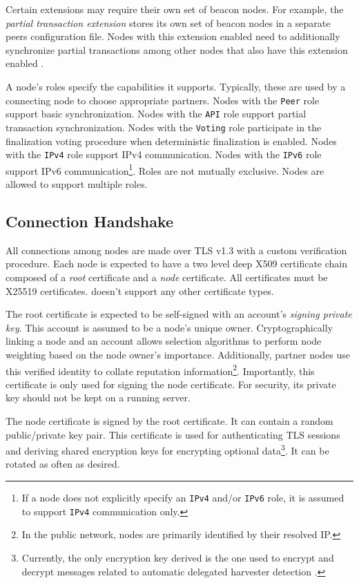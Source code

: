Certain extensions may require their own set of beacon nodes.
For example, the \emph{partial transaction extension} stores its own set of beacon nodes in a separate peers configuration file.
Nodes with this extension enabled need to additionally synchronize partial transactions among other nodes that also have this extension enabled  .

A node's roles specify the capabilities it supports.
Typically, these are used by a connecting node to choose appropriate partners.
Nodes with the \texttt{Peer} role support basic synchronization.
Nodes with the \texttt{API} role support partial transaction synchronization.
Nodes with the \texttt{Voting} role participate in the finalization voting procedure when deterministic finalization is enabled.
Nodes with the \texttt{IPv4} role support IPv4 communication.
Nodes with the \texttt{IPv6} role support IPv6 communication\footnote{
	If a node does not explicitly specify an \texttt{IPv4} and/or \texttt{IPv6} role, it is assumed to support \texttt{IPv4} communication only.
}.
Roles are not mutually exclusive.
Nodes are allowed to support multiple roles.

\subsection{Connection Handshake}
\label{sec:network:connectionHandshake}

All connections among \codenamespace nodes are made over TLS v1.3 with a custom verification procedure.
Each node is expected to have a two level deep X509 certificate chain composed of a \emph{root} certificate and a \emph{node} certificate.
All certificates must be X25519 certificates.
\codenamespace doesn't support any other certificate types.

The root certificate is expected to be self-signed with an account's \emph{signing private key}.
This account is assumed to be a node's unique owner.
Cryptographically linking a node and an account allows selection algorithms to perform node weighting based on the node owner's importance.
Additionally, partner nodes use this verified identity to collate reputation  information\footnote{
	In the public network, nodes are primarily identified by their resolved IP.
}.
Importantly, this certificate is only used for signing the node certificate.
For security, its private key should not be kept on a running server.

The node certificate is signed by the root certificate.
It can contain a random public/private key pair.
This certificate is used for authenticating TLS sessions and deriving shared encryption keys for encrypting optional data\footnote{
	Currently, the only encryption key derived is the one used to encrypt and decrypt messages related to automatic delegated harvester detection
	.
}.
It can be rotated as often as desired.

